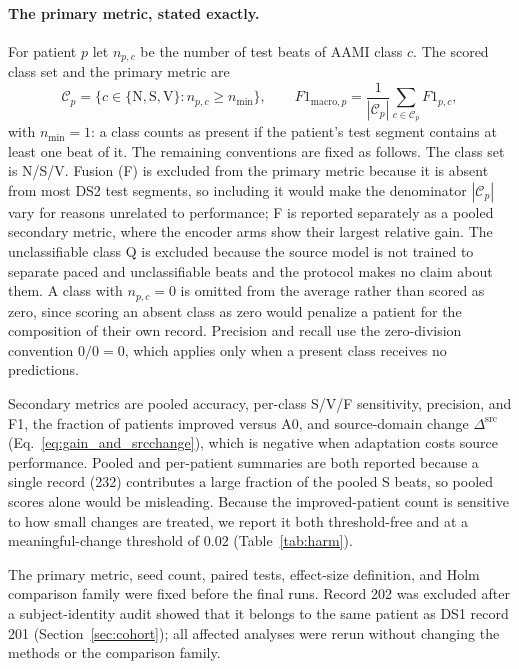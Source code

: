 \paragraph{The primary metric, stated exactly.} For patient $p$ let $n_{p,c}$ be
the number of test beats of AAMI class $c$. The scored class set and the primary
metric are
\begin{equation}
\mathcal{C}_p = \{c \in \{\mathrm{N},\mathrm{S},\mathrm{V}\} : n_{p,c} \ge n_{\min}\},
\qquad
F1_{\mathrm{macro},p} = \frac{1}{|\mathcal{C}_p|}\sum_{c \in \mathcal{C}_p} F1_{p,c},
\label{eq:metric}
\end{equation}
with $n_{\min} = 1$: a class counts as present if the patient's test segment
contains at least one beat of it. The remaining conventions are fixed as follows.
The class set is N/S/V. Fusion (F) is excluded from the primary metric because it
is absent from most DS2 test segments, so including it would make the
denominator $|\mathcal{C}_p|$ vary for reasons unrelated to performance; F is
reported separately as a pooled secondary metric, where the encoder arms show
their largest relative gain. The unclassifiable class Q is excluded because the
source model is not trained to separate paced and unclassifiable beats and the
protocol makes no claim about them. A class with $n_{p,c} = 0$ is omitted from
the average rather than scored as zero, since scoring an absent class as zero
would penalize a patient for the composition of their own record. Precision and
recall use the zero-division convention $0/0 = 0$, which applies only when a
present class receives no predictions.

Secondary metrics are pooled accuracy, per-class S/V/F sensitivity, precision,
and F1, the fraction of patients improved versus A0, and source-domain \macrof{}
change $\Delta^{\mathrm{src}}$ (Eq.~\ref{eq:gain_and_srcchange}), which is negative when
adaptation costs source performance. Pooled and per-patient summaries are both reported because a
single record (232) contributes a large fraction of the pooled S beats, so pooled
scores alone would be misleading. Because the improved-patient count is sensitive
to how small changes are treated, we report it both threshold-free and at a
meaningful-change threshold of $0.02$ \macrof{} (Table~\ref{tab:harm}).

The primary metric, seed count, paired tests, effect-size definition, and Holm
comparison family were fixed before the final runs. Record 202 was excluded after
a subject-identity audit showed that it belongs to the same patient as DS1
record 201 (Section~\ref{sec:cohort}); all affected analyses were rerun without
changing the methods or the comparison family.

